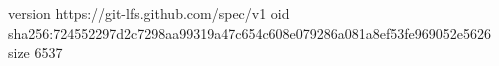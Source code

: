 version https://git-lfs.github.com/spec/v1
oid sha256:724552297d2c7298aa99319a47c654c608e079286a081a8ef53fe969052e5626
size 6537
